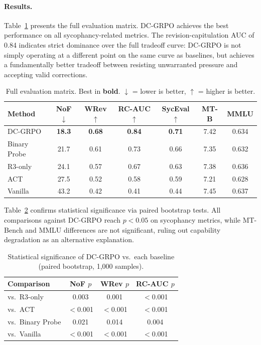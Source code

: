 \documentclass[11pt]{article}
\begin{document}
\paragraph{Results.}
Table~\ref{tab:main_results} presents the full evaluation matrix. DC-GRPO achieves the best performance on all sycophancy-related metrics. The revision-capitulation AUC of 0.84 indicates strict dominance over the full tradeoff curve: DC-GRPO is not simply operating at a different point on the same curve as baselines, but achieves a fundamentally better tradeoff between resisting unwarranted pressure and accepting valid corrections.

\begin{table}[h]
\centering
\caption{Full evaluation matrix. Best in \textbf{bold}. $\downarrow$ = lower is better, $\uparrow$ = higher is better.}
\label{tab:main_results}
\begin{tabular}{lcccccc}
\toprule
Method & NoF$\downarrow$ & WRev$\uparrow$ & RC-AUC$\uparrow$ & SycEval$\uparrow$ & MT-B & MMLU \\
\midrule
DC-GRPO      & \textbf{18.3} & \textbf{0.68} & \textbf{0.84} & \textbf{0.71} & 7.42 & 0.634 \\
Binary Probe & 21.7          & 0.61          & 0.73          & 0.66          & 7.35 & 0.632 \\
R3-only      & 24.1          & 0.57          & 0.67          & 0.63          & 7.38 & 0.636 \\
ACT          & 27.5          & 0.52          & 0.58          & 0.59          & 7.21 & 0.628 \\
Vanilla      & 43.2          & 0.42          & 0.41          & 0.44          & 7.45 & 0.637 \\
\bottomrule
\end{tabular}
\end{table}

Table~\ref{tab:significance} confirms statistical significance via paired bootstrap tests. All comparisons against DC-GRPO reach $p < 0.05$ on sycophancy metrics, while MT-Bench and MMLU differences are not significant, ruling out capability degradation as an alternative explanation.

\begin{table}[h]
\centering
\caption{Statistical significance of DC-GRPO vs.\ each baseline (paired bootstrap, 1,000 samples).}
\label{tab:significance}
\begin{tabular}{lccc}
\toprule
Comparison & NoF $p$ & WRev $p$ & RC-AUC $p$ \\
\midrule
vs.\ R3-only      & 0.003    & 0.001    & $<$0.001 \\
vs.\ ACT          & $<$0.001 & $<$0.001 & $<$0.001 \\
vs.\ Binary Probe & 0.021    & 0.014    & 0.004    \\
vs.\ Vanilla      & $<$0.001 & $<$0.001 & $<$0.001 \\
\bottomrule
\end{tabular}
\end{table}
\end{document}
